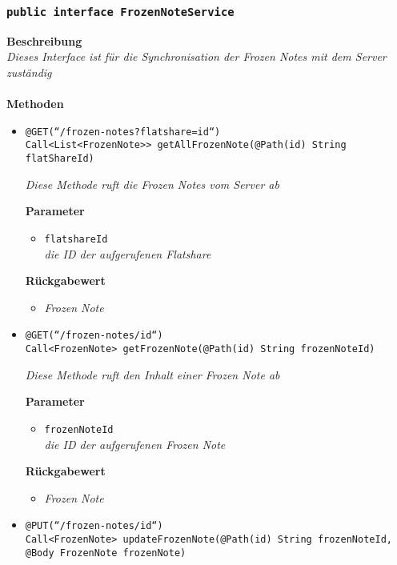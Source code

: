 	\subsubsection{\texttt{public interface FrozenNoteService }}
	\textbf{Beschreibung}\\
	\textit{Dieses Interface ist für die Synchronisation der Frozen Notes mit dem Server zuständig}\\
\\
	\textbf{Methoden} 
		\begin{itemize}
		\item\texttt{{@GET(``/frozen-notes?flatshare={id}``)\\
Call<List<FrozenNote>> getAllFrozenNote(@Path(\grqq id\grqq) String flatShareId)}}

		\textit{Diese Methode ruft die Frozen Notes vom Server ab}

		\textbf{Parameter} 
			\begin{itemize}
				\item\texttt{flatshareId}\\
		 		\textit{die ID der aufgerufenen Flatshare}
	 		\end{itemize}

		\textbf{Rückgabewert} 
		\begin{itemize}
		\item\textit{Frozen Note}
		\end{itemize}
		
		
      \item\texttt{{@GET(``/frozen-notes/{id}``)\\ Call<FrozenNote> getFrozenNote(@Path(\grqq id\grqq) String frozenNoteId)}}

		\textit{Diese Methode ruft den Inhalt einer Frozen Note ab }
	
		\textbf{Parameter} 
			\begin{itemize}
				\item\texttt{frozenNoteId}\\
		 		\textit{die ID der aufgerufenen Frozen Note }
	 		\end{itemize}

		\textbf{Rückgabewert} 
		\begin{itemize}
		\item\textit{Frozen Note}
		\end{itemize}

	 \item\texttt{{@PUT(``/frozen-notes/{id}``)\\ Call<FrozenNote> updateFrozenNote(@Path(\grqq id\grqq) String frozenNoteId, @Body FrozenNote frozenNote)}}


\end{itemize}
